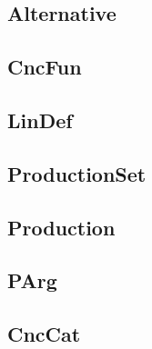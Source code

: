 \subsection{Alternative}
\subsection{CncFun}
\subsection{LinDef}
\subsection{ProductionSet}
\subsection{Production}
\subsection{PArg}
\subsection{CncCat}
